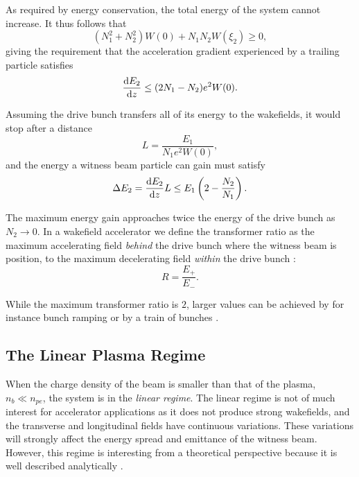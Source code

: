 As required by energy conservation, the total energy of the system cannot increase. It thus follows that
\begin{equation}
    (N_{1}^{2} + N_{2}^{2})W(0) + N_{1}N_{2}W(\xi_{2}) \geq 0, \label{EQ:TRat:EConv}
\end{equation}
giving the requirement that the acceleration gradient experienced by a trailing particle satisfies
\begin{equation}
    \frac{\mathrm{d} E_{2}}{\mathrm{d} z} \leq (2N_{1} - N_{2})e^{2}W(0). \label{EQ:TRat:Grad}
\end{equation}

Assuming the drive bunch transfers all of its energy to the wakefields, it would stop after a distance
\begin{equation}
    L = \frac{E_{1}}{N_{1}e^{2}W(0)}, \label{EQ:Trat:LStop}
\end{equation}
and the energy a witness beam particle can gain must satisfy
\begin{equation}
    \Delta E_{2} = \frac{\mathrm{d} E_{2}}{\mathrm{d} z}L
                 \leq E_{1}\left(2-\frac{N_{2}}{N_{1}}\right). \label{EQ:TRat:DeltaE}
\end{equation}

The maximum energy gain approaches twice the energy of the drive bunch as $N_{2} \to 0$. In a wakefield accelerator we define the transformer ratio as the maximum accelerating field \textit{behind} the drive bunch where the witness beam is position, to the maximum decelerating field \textit{within} the drive bunch \cite{muggli:2017}:
\begin{equation}
    R = \frac{E_{+}}{E_{-}}. \label{EQ:TRat}
\end{equation}

While the maximum transformer ratio is $2$, larger values can be achieved by for instance bunch ramping \cite{bane:1985} or by a train of bunches \cite{jing:2006}.

\subsection{The Linear Plasma Regime}
\label{Int:BPI:Lin}

When the charge density of the beam is smaller than that of the plasma, $n_{b} \ll n_{pe}$, the system is in the \textit{linear regime}. The linear regime is not of much interest for accelerator applications as it does not produce strong wakefields, and the transverse and longitudinal fields have continuous variations. These variations will strongly affect the energy spread and emittance of the witness beam. However, this regime is interesting from a theoretical perspective because it is well described analytically \cite{muggli:2017}.

